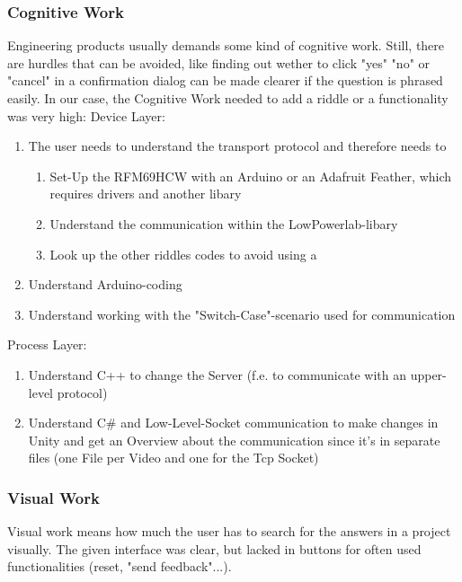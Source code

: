 \subsubsection{Cognitive Work}
Engineering products usually demands some kind of cognitive work. Still, there are hurdles that can be avoided,
like finding out wether to click "yes" "no" or "cancel" in a confirmation dialog can be made clearer if the question is phrased easily.
In our case, the Cognitive Work needed to add a riddle or a functionality was very high:
Device Layer:
\begin{enumerate}
    \item The user needs to understand the transport protocol and therefore needs to 
    \begin{enumerate}
        \item Set-Up the RFM69HCW with an Arduino or an Adafruit Feather, which requires drivers and another libary
        \item Understand the communication within the LowPowerlab-libary
        \item Look up the other riddles codes to avoid using a %
    \end{enumerate}   
    \item Understand Arduino-coding 
    \item Understand working with the "Switch-Case"-scenario used for communication 
\end{enumerate}  
Process Layer:
\begin{enumerate}
    \item Understand C++ to change the Server (f.e. to communicate with an upper-level protocol)
    \item Understand C\# and Low-Level-Socket communication to make changes in Unity 
    and get an Overview about the communication since it's in separate files (one File per Video and one for the Tcp Socket) 
\end{enumerate}  

\subsubsection{Visual Work}
Visual work means how much the user has to search for the answers in a project visually.
The given interface was clear, but lacked in buttons for often used functionalities (reset, "send feedback"...).

